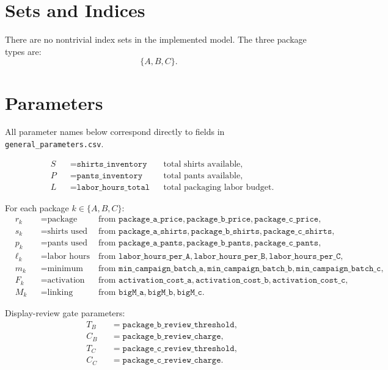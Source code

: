 \section*{Sets and Indices}

There are no nontrivial index sets in the implemented model. The three package types are:
\[
\{A,B,C\}.
\]

\section*{Parameters}

All parameter names below correspond directly to fields in \texttt{general\_parameters.csv}.

\[
\begin{aligned}
&S &&= \texttt{shirts\_inventory} &&\text{total shirts available},\\
&P &&= \texttt{pants\_inventory} &&\text{total pants available},\\
&L &&= \texttt{labor\_hours\_total} &&\text{total packaging labor budget}.
\end{aligned}
\]

For each package \(k\in\{A,B,C\}\):
\[
\begin{aligned}
&r_k &&= \text{package revenue per unit} 
&&\text{from }\texttt{package\_a\_price},\texttt{package\_b\_price},\texttt{package\_c\_price},\\
&s_k &&= \text{shirts used per unit}
&&\text{from }\texttt{package\_a\_shirts},\texttt{package\_b\_shirts},\texttt{package\_c\_shirts},\\
&p_k &&= \text{pants used per unit}
&&\text{from }\texttt{package\_a\_pants},\texttt{package\_b\_pants},\texttt{package\_c\_pants},\\
&\ell_k &&= \text{labor hours per unit}
&&\text{from }\texttt{labor\_hours\_per\_A},\texttt{labor\_hours\_per\_B},\texttt{labor\_hours\_per\_C},\\
&m_k &&= \text{minimum campaign batch if launched}
&&\text{from }\texttt{min\_campaign\_batch\_a},\texttt{min\_campaign\_batch\_b},\texttt{min\_campaign\_batch\_c},\\
&F_k &&= \text{activation cost if launched}
&&\text{from }\texttt{activation\_cost\_a},\texttt{activation\_cost\_b},\texttt{activation\_cost\_c},\\
&M_k &&= \text{linking upper bound}
&&\text{from }\texttt{bigM\_a},\texttt{bigM\_b},\texttt{bigM\_c}.
\end{aligned}
\]

Display-review gate parameters:
\[
\begin{aligned}
&T_B &&= \texttt{package\_b\_review\_threshold},\\
&C_B &&= \texttt{package\_b\_review\_charge},\\
&T_C &&= \texttt{package\_c\_review\_threshold},\\
&C_C &&= \texttt{package\_c\_review\_charge}.
\end{aligned}
\]

